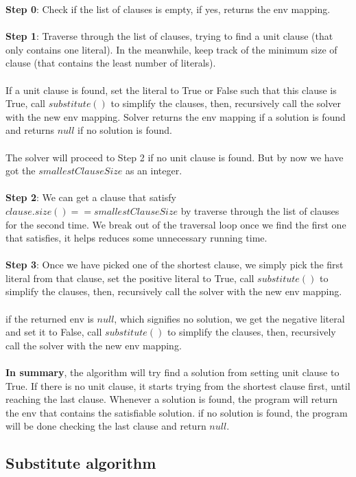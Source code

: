 \documentclass[a4paper,12pt]{article}
\begin{document}
\begin{multicols}{2}
\textbf{Step 0}: Check if the list of clauses is empty, if yes, returns the env mapping.\\
\\
\textbf{Step 1}: Traverse through the list of clauses,
trying to find a unit clause (that only contains one literal). 
In the meanwhile, keep track of the minimum size of clause 
(that contains the least number of literals). \\
\\
If a unit clause is found, set the literal to True or False such that this clause is True, 
call $substitute()$ to simplify the clauses, then, recursively call the solver with the new env mapping.
Solver returns the env mapping if a solution is found and returns $null$ if no solution is found.\\
\\ 
The solver will proceed to Step 2 if no unit clause is found. 
But by now we have got the $smallestClauseSize$ as an integer. \\
\\
\textbf{Step 2}: We can get a clause that satisfy $clause.size() == smallestClauseSize$
by traverse through the list of clauses for the second time. 
We break out of the traversal loop once we find the first one that satisfies, 
it helps reduces some unnecessary running time.\\
\\
\textbf{Step 3}: Once we have picked one of the shortest clause, 
we simply pick the first literal from that clause, set the positive literal to True,
call $substitute()$ to simplify the clauses, then, 
recursively call the solver with the new env mapping.\\
\\
if the returned env is $null$, which signifies no solution, we get the negative literal
and set it to False, call $substitute()$ to simplify the clauses, then, 
recursively call the solver with the new env mapping.\\
\\
\textbf{In summary}, the algorithm will try find a solution from setting unit clause to True. 
If there is no unit clause, it starts trying from the shortest clause first, until reaching the last clause.
Whenever a solution is found, the program will return the env that contains the satisfiable solution.
if no solution is found, the program will be done checking the last clause and return $null$.

\subsection*{Substitute algorithm}


\end{multicols}
\end{document}
